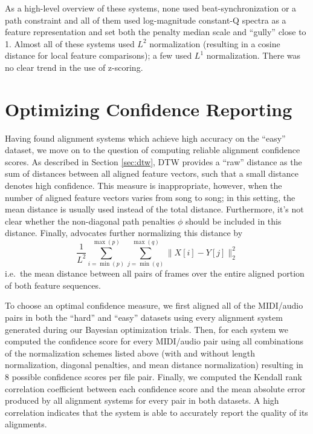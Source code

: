 As a high-level overview of these systems, none used beat-synchronization or a path constraint and all of them used log-magnitude constant-Q spectra as a feature representation and set both the penalty median scale and ``gully'' close to 1.
Almost all of these systems used $L^2$ normalization (resulting in a cosine distance for local feature comparisons); a few used $L^1$ normalization.
There was no clear trend in the use of z-scoring.

\section{Optimizing Confidence Reporting}
\label{sec:confidence}

Having found alignment systems which achieve high accuracy on the ``easy'' dataset, we move on to the question of computing reliable alignment confidence scores.
As described in Section \ref{sec:dtw}, DTW provides a ``raw'' distance as the sum of distances between all aligned feature vectors, such that a small distance denotes high confidence.
This measure is inappropriate, however, when the number of aligned feature vectors varies from song to song; in this setting, the mean distance is usually used instead of the total distance.
Furthermore, it's not clear whether the non-diagonal path penalties $\phi$ should be included in this distance.
Finally, \cite{raffel2015large} advocates further normalizing this distance by
$$
\frac{1}{L^2} \sum_{i = \min(p)}^{\max(p)} \sum_{j = \min(q)}^{\max(q)} \|X[i] - Y[j]\|_2^2
$$
i.e.\ the mean distance between all pairs of frames over the entire aligned portion of both feature sequences.

To choose an optimal confidence measure, we first aligned all of the MIDI/audio pairs in both the ``hard'' and ``easy'' datasets using every alignment system generated during our Bayesian optimization trials.
Then, for each system we computed the confidence score for every MIDI/audio pair using all combinations of the normalization schemes listed above (with and without length normalization, diagonal penalties, and mean distance normalization) resulting in 8 possible confidence scores per file pair.
Finally, we computed the Kendall rank correlation coefficient \cite{kendall1938new} between each confidence score and the mean absolute error produced by all alignment systems for every pair in both datasets.
A high correlation indicates that the system is able to accurately report the quality of its alignments.


